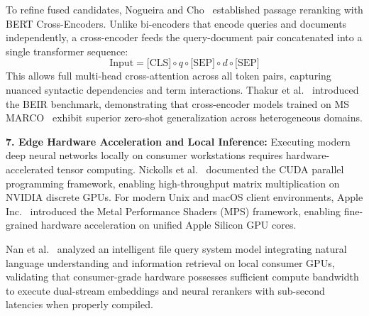 \documentclass[a4paper,12pt]{article}
\begin{document}
To refine fused candidates, Nogueira and Cho~\cite{nogueira2019passage} established passage reranking with BERT Cross-Encoders. Unlike bi-encoders that encode queries and documents independently, a cross-encoder feeds the query-document pair concatenated into a single transformer sequence:
\begin{equation}
\text{Input} = \text{[CLS]} \circ q \circ \text{[SEP]} \circ d \circ \text{[SEP]}
\end{equation}
This allows full multi-head cross-attention across all token pairs, capturing nuanced syntactic dependencies and term interactions. Thakur et al.~\cite{thakur2021beir} introduced the BEIR benchmark, demonstrating that cross-encoder models trained on MS MARCO~\cite{nguyen2016msmarco} exhibit superior zero-shot generalization across heterogeneous domains.

\vspace{0.8em}
\noindent\textbf{7. Edge Hardware Acceleration and Local Inference:}
Executing modern deep neural networks locally on consumer workstations requires hardware-accelerated tensor computing. Nickolls et al.~\cite{nickolls2008cuda} documented the CUDA parallel programming framework, enabling high-throughput matrix multiplication on NVIDIA discrete GPUs. For modern Unix and macOS client environments, Apple Inc.~\cite{apple2026mps} introduced the Metal Performance Shaders (MPS) framework, enabling fine-grained hardware acceleration on unified Apple Silicon GPU cores.

Nan et al.~\cite{nan2026dsmr} analyzed an intelligent file query system model integrating natural language understanding and information retrieval on local consumer GPUs, validating that consumer-grade hardware possesses sufficient compute bandwidth to execute dual-stream embeddings and neural rerankers with sub-second latencies when properly compiled.
\end{document}
